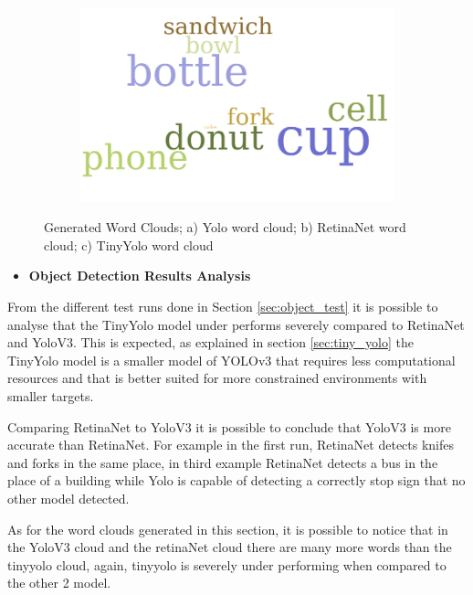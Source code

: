 \begin{figure}[H]
      \begin{subfigure}{0.3\textwidth}
      \includegraphics[width=\textwidth]{Sections/4InitialWork/4_images_wordcloud/tiny_yolo_pic.png}\hfill
      \caption{}
      \end{subfigure}
      \caption[Generated Word Clouds]{Generated Word Clouds; a) Yolo word cloud; b) RetinaNet word cloud; c) TinyYolo word cloud}
    \end{figure}

    \newpage
    
    \begin{itemize}
      \item \textbf{Object Detection Results Analysis}
    \end{itemize}

    

     From the different test runs done in Section \ref{sec:object_test} it is possible to analyse that the TinyYolo model under performs severely compared to RetinaNet and YoloV3. This is expected, as explained in section \ref{sec:tiny_yolo} the TinyYolo model is a smaller model of YOLOv3 that requires less computational resources and that is better suited for more constrained environments with smaller targets.

     Comparing RetinaNet to YoloV3 it is possible to conclude that YoloV3 is more accurate than RetinaNet. For example in the first run, RetinaNet detects knifes and forks in the same place, in third example RetinaNet detects a bus in the place of a building while Yolo is capable of detecting a correctly stop sign that no other model detected.

     As for the word clouds generated in this section, it is possible to notice that in the YoloV3 cloud and the retinaNet cloud there are many more words than the tinyyolo cloud, again, tinyyolo is severely under performing when compared to the other 2 model.
     
